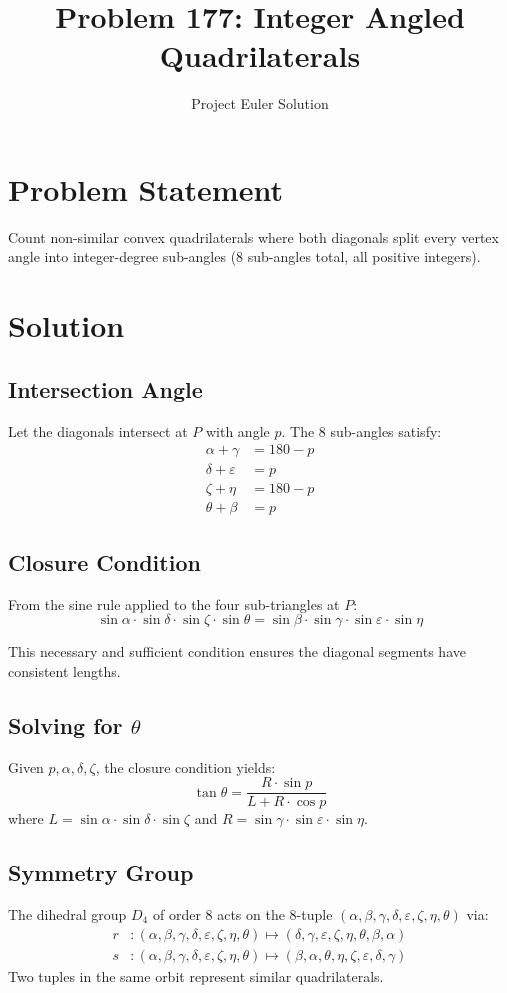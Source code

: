 \documentclass[12pt]{article}
\title{Problem 177: Integer Angled Quadrilaterals}
\author{Project Euler Solution}
\date{}
\begin{document}
\maketitle

\section{Problem Statement}
Count non-similar convex quadrilaterals where both diagonals split every vertex angle into integer-degree sub-angles (8 sub-angles total, all positive integers).

\section{Solution}

\subsection{Intersection Angle}
Let the diagonals intersect at $P$ with angle $p$. The 8 sub-angles satisfy:
\begin{align*}
\alpha + \gamma &= 180 - p \\
\delta + \varepsilon &= p \\
\zeta + \eta &= 180 - p \\
\theta + \beta &= p
\end{align*}

\subsection{Closure Condition}
From the sine rule applied to the four sub-triangles at $P$:
\[
\sin\alpha \cdot \sin\delta \cdot \sin\zeta \cdot \sin\theta = \sin\beta \cdot \sin\gamma \cdot \sin\varepsilon \cdot \sin\eta
\]

This necessary and sufficient condition ensures the diagonal segments have consistent lengths.

\subsection{Solving for $\theta$}
Given $p, \alpha, \delta, \zeta$, the closure condition yields:
\[
\tan\theta = \frac{R \cdot \sin p}{L + R \cdot \cos p}
\]
where $L = \sin\alpha \cdot \sin\delta \cdot \sin\zeta$ and $R = \sin\gamma \cdot \sin\varepsilon \cdot \sin\eta$.

\subsection{Symmetry Group}
The dihedral group $D_4$ of order 8 acts on the 8-tuple $(\alpha,\beta,\gamma,\delta,\varepsilon,\zeta,\eta,\theta)$ via:
\begin{align*}
r &: (\alpha,\beta,\gamma,\delta,\varepsilon,\zeta,\eta,\theta) \mapsto (\delta,\gamma,\varepsilon,\zeta,\eta,\theta,\beta,\alpha) \\
s &: (\alpha,\beta,\gamma,\delta,\varepsilon,\zeta,\eta,\theta) \mapsto (\beta,\alpha,\theta,\eta,\zeta,\varepsilon,\delta,\gamma)
\end{align*}
Two tuples in the same orbit represent similar quadrilaterals.
\end{document}
